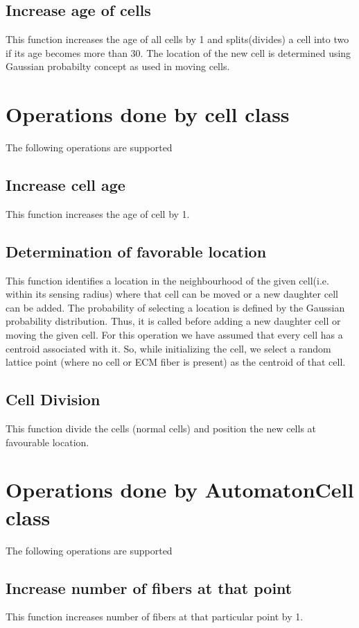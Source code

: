\documentclass[11pt]{report}
\begin{document}
  \subsection{\color{blue}Increase age of cells}
  This function increases the age of all cells by 1 and splits(divides) a cell into two if its age becomes more than 30.
  The location of the new cell is determined using Gaussian probabilty concept as used in moving cells.

  \section{\color{red} Operations done by cell class}
  The following operations are supported
  \subsection{\color{blue}Increase cell age}
  This function increases the age of cell by 1.
  \subsection{\color{blue}Determination of favorable location}
  This function identifies a location in the neighbourhood of the given cell(i.e. within its sensing radius)  where that cell can be moved or a new daughter cell can be added. The probability of selecting a location is defined by the Gaussian probability distribution.
  Thus, it is called before adding a new daughter cell or moving the given cell.
  For this operation we have assumed that every cell has a centroid associated with it. So, while initializing the cell, we select a random lattice point (where no cell or ECM fiber is present) as the centroid of that cell.
  \subsection{\color{blue}Cell Division}
  This function divide the cells (normal cells) and position the new cells at favourable location.
  
  \section{\color{red} Operations done by AutomatonCell class}
  The following operations are supported
  \subsection{\color{blue}Increase number of fibers at that point}
  This function increases number of fibers at that particular point by 1.
  
\end{document}
